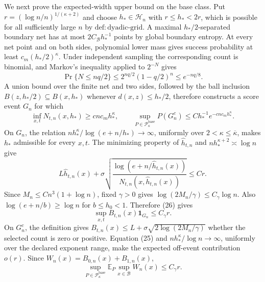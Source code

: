 We next prove the expected-width upper bound on the base class. Put \(r=(\log n/n)^{1/(\kappa+2)}\) and choose \(h_*\in\mathcal H_n\) with \(r\le h_*<2r\), which is possible for all sufficiently large \(n\) by \(\mathrm{def:dyadic\text{-}grid}\). A maximal \(h_*/2\)-separated boundary net has at most \(2C_{\mathcal B}h_*^{-1}\) points by global boundary entropy. At every net point and on both sides, polynomial lower mass gives success probability at least \(c_m(h_*/2)^\kappa\). Under independent sampling the corresponding count is binomial, and Markov's inequality applied to \(2^{-N}\) gives
\[
 \Pr\{N\le nq/2\}
 \le2^{nq/2}(1-q/2)^n\le e^{-nq/8}.
\]
A union bound over the finite net and two sides, followed by the ball inclusion \(B(z,h_*/2)\subseteq B(x,h_*)\) whenever \(d(x,z)\le h_*/2\), therefore constructs a score event \(G_n\) for which
\[
 \inf_{x,t}N_{t,n}(x,h_*)\ge cnc_mh_*^\kappa,
 \qquad
 \sup_{P\in\mathcal P_{\kappa}^{\mathrm{base}}}P(G_n^c)
 \le Ch_*^{-1}e^{-cnc_mh_*^\kappa}. \tag{25}
\]
On \(G_n\), the relation \(nh_*^\kappa/\log(e+n/h_*)\to\infty\), uniformly over \(2<\kappa\le\overline\kappa\), makes \(h_*\) admissible for every \(x,t\). The minimizing property of \(\widehat h_{t,n}\) and \(nh_*^{\kappa+2}\asymp\log n\) give
\[
 L\widehat h_{t,n}(x)+
 \sigma\sqrt{\frac{\log(e+n/\widehat h_{t,n}(x))}
 {N_{t,n}(x,\widehat h_{t,n}(x))}}
 \le Cr. \tag{26}
\]
Since \(M_n\le Cn^3(1+\log n)\), fixed \(\gamma>0\) gives \(\log(2M_n/\gamma)\le C_\gamma\log n\). Also \(\log(e+n/b)\ge\log n\) for \(b\le h_0<1\). Therefore (26) gives
\[
 \sup_{x,t}B_{t,n}(x)\mathbf 1_{G_n}\le C_\gamma r. \tag{27}
\]
On \(G_n^c\), the definition gives \(B_{t,n}(x)\le L+\sigma\sqrt{2\log(2M_n/\gamma)}\) whether the selected count is zero or positive. Equation (25) and \(nh_*^\kappa/\log n\to\infty\), uniformly over the declared exponent range, make the expected off-event contribution \(o(r)\). Since \(W_n(x)=B_{0,n}(x)+B_{1,n}(x)\),
\[
 \sup_{P\in\mathcal P_{\kappa}^{\mathrm{base}}}
 \mathbb E_P\sup_{x\in\mathcal B}W_n(x)\le C_\gamma r. \tag{28}
\]

